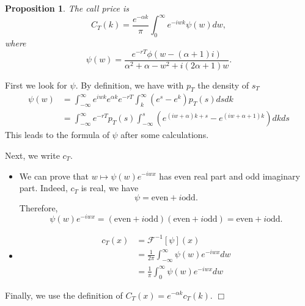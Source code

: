 \documentclass{article}
\newtheorem{proposition}[theorem]{Proposition}
\newenvironment{proof}{\noindent {\sc Proof:}}{$\Box$} %
\begin{document}
\begin{proposition}
The call price is 
$$C_T(k) = \frac{e^{-\alpha k}}{\pi} \int_0^\infty e^{-i w k} \psi(w) dw,$$
where
$$\psi(w) = \frac{e^{-rT} \phi(w - (\alpha + 1) i)}{\alpha^2 + \alpha - w^2 + i (2\alpha+1)w}.$$
\end{proposition}
\begin{proof}
First we look for $\psi$. 
By definition, we have with $p_T$ the density of $s_T$
$$
\begin{array}
{ll}
\psi(w) &= 
\int_{-\infty}^{\infty} e^{iwk} e^{\alpha k} e^{-rT} \int_k^\infty (e^s - e^k) p_T(s) ds dk
\\ & = 
\int_{-\infty}^{\infty} e^{-rT} p_T(s) \int_{-\infty}^s (e^{(iw+\alpha)k + s} - e^{(iw+\alpha+1)k}) dkds
\end{array}
$$
This leads to the formula of $\psi$ after some calculations.

Next, we write $c_T$.
\begin{itemize}
\item
We can prove that $w \mapsto \psi(w) e^{-i w x}$ has even real part and odd imaginary part.
Indeed, $c_T$ is real, we have $$\psi = \text{even} + i \text{odd}.$$
Therefore, $$\psi(w) e^{-i w x} = (\text{even} + i \text{odd})(\text{even} + i \text{odd}) = \text{even} + i \text{odd}.$$
\item 
$$\begin{array}
{ll}
c_T(x) &= \mathcal F^{-1} [\psi](x) 
\\ & = 
\frac 1 {2\pi} \int_{-\infty}^\infty \psi(w) e^{-i w x} dw
\\ & = 
\frac 1 {\pi}  \int_{0}^\infty  \psi(w) e^{-i w x} dw
\end{array}
$$
\end{itemize}
Finally, we use the definition of $C_T(x) = e^{-\alpha k} c_T(k)$.
\end{proof}




%
%
%
%
\end{document}
